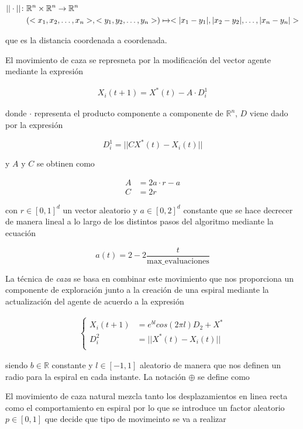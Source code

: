 \documentclass[11pt]{article}
\begin{document}
\begin{align*}
    ||\cdot||\colon & \mathbb{R}^n\times\mathbb{R}^n \to \mathbb{R}^n\\
    & (<x_1, x_2, \dots, x_n>, <y_1, y_2, \dots, y_n>) \xmapsto{}<|x_1 - y_1|, |x_2-y_2|, \dots, |x_n-y_n|>
\end{align*}

que es la distancia coordenada a coordenada.

El movimiento de caza se represneta por la modificación del vector agente
mediante la expresión

\begin{align}
    X_i(t+1) = X^*(t) - A\cdot D_i^1  \label{eq:1}
\end{align}

donde $\cdot$ representa el producto componente a componente de $\mathbb{R}^n$, $D$ viene dado por
la expresión

\[
    D^1_i = ||CX^*(t)-X_i(t)||    
\]

y $A \text{ y } C$ se obtinen como 

\begin{align*}
    A &= 2a\cdot r - a \\
    C &= 2r
\end{align*}

con $r \in [0,1]^d$ un vector aleatorio y $a\in [0,2]^d$ constante que se hace
decrecer de manera lineal a lo largo de los distintos pasos del algoritmo
mediante la ecuación

\[
  a(t) = 2-2\frac{t}{\text{max\_evaluaciones}}  
\]

La técnica de \textit{caza} se basa en combinar este movimiento que nos
proporciona un componente de exploración junto a la creación de una espiral 
mediante la actualización del agente de acuerdo a la expresión 

\begin{align}
\begin{cases}
    X_i(t+1) &= e^{bl}cos(2\pi l)D_2 + X^* \\
    D^2_i &= ||X^*(t)-X_i(t)||\\
\end{cases}\label{eq:2}
\end{align}

siendo $b \in \mathbb{R}$ constante y $l \in [-1,1]$ aleatorio de manera que
nos definen un radio para la espiral en cada instante. La notación $\oplus$ 
se define como 



El movimiento de caza natural mezcla tanto los desplazamientos en linea recta
como el comportamiento en espiral por lo que se introduce un factor aleatorio
$p \in [0,1]$ que decide que tipo de movimeinto se va a realizar
\end{document}
